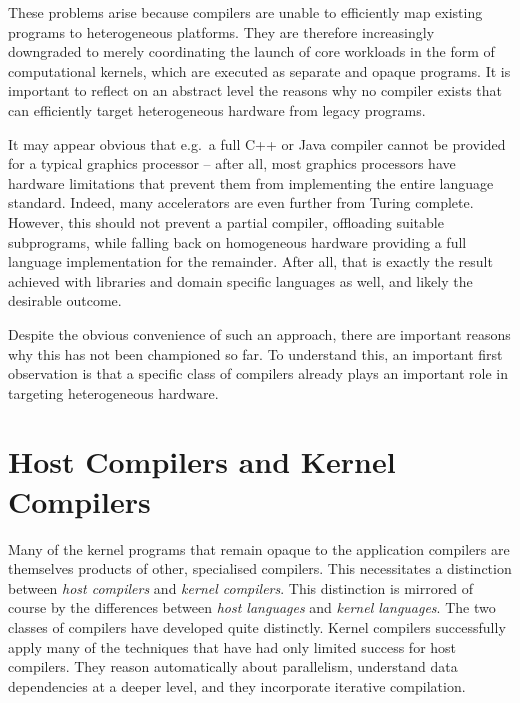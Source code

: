     These problems arise because compilers are unable to efficiently map
    existing programs to heterogeneous platforms.
    They are therefore increasingly downgraded to merely coordinating the launch
    of core workloads in the form of computational kernels, which are
    executed as separate and opaque programs.
    It is important to reflect on an abstract level the reasons why no compiler
    exists that can efficiently target heterogeneous hardware from legacy
    programs.

    It may appear obvious that e.g.\ a full C++ or Java compiler cannot be
    provided for a typical graphics processor -- after all, most graphics
    processors have hardware limitations that prevent them from implementing the
    entire language standard.
    Indeed, many accelerators are even further from Turing complete.
    However, this should not prevent a partial compiler, offloading suitable
    subprograms, while falling back on homogeneous hardware providing a full
    language implementation for the remainder.
    After all, that is exactly the result achieved with libraries and domain
    specific languages as well, and likely the desirable outcome.

    Despite the obvious convenience of such an approach, there are important
    reasons why this has not been championed so far.
    To understand this, an important first observation is that a specific class
    of compilers already plays an important role in targeting heterogeneous
    hardware.

\section{Host Compilers and Kernel Compilers}

    Many of the kernel programs that remain opaque to the application compilers
    are themselves products of other, specialised compilers.
    This necessitates a distinction between {\em host compilers} and {\em kernel
    compilers}.
    This distinction is mirrored of course by the differences between {\em host
    languages} and {\em kernel languages}.
    The two classes of compilers have developed quite distinctly.
    Kernel compilers successfully apply many of the techniques that have had
    only limited success for host compilers.
    They reason automatically about parallelism, understand data dependencies at
    a deeper level, and they incorporate iterative compilation.

